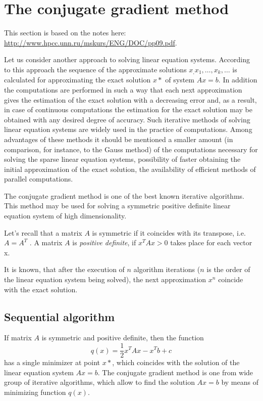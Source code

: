 
\section{The conjugate gradient method} %
\label{sec:the_conjugate_gradient_method}
This section is based on the notes here: \url{http://www.hpcc.unn.ru/mskurs/ENG/DOC/pp09.pdf}.

Let us consider another approach to solving linear equation systems. According to this approach the sequence of the approximate solutions $x_, x_1, \dots, x_k,\dots$ is calculated for approximating the exact solution $x*$ of system $Ax=b$. In addition the computations are performed in such a way that each next approximation gives the estimation of the exact solution with a decreasing error and, as a result, in case of continuous computations the estimation for the exact solution may be obtained with any desired degree of accuracy. Such iterative methods of solving linear equation systems are widely used in the practice of computations. Among advantages of these methods it should be mentioned a smaller amount (in comparison, for instance, to the Gauss method) of the computations necessary for solving the sparse linear equation systems, possibility of faster obtaining the initial approximation of the exact solution, the availability of efficient methods of parallel computations.

The conjugate gradient method is one of the best known iterative algorithms. This method may be used for solving a symmetric positive definite linear equation system of high dimensionality.

Let’s recall that a matrix $A$ is symmetric if it coincides with its transpose, i.e. $A=A^T$ . A matrix $A$ is \emph{positive definite}, if $x^T Ax > 0$ takes place for each vector x.

It is known, that after the execution of $n$ algorithm iterations ($n$ is the order of the linear equation system being solved), the next approximation $x^n$ coincide with the exact solution.

\subsection{Sequential algorithm} %
\label{sub:sequential_algorithm}

If matrix $A$ is symmetric and positive definite, then the function
\begin{equation}
  q(x) = \frac{1}{2} x^T A x - x^T b + c
\end{equation}
has a single minimizer at point $x*$, which coincides with the solution of the linear equation system $Ax=b$. The conjugate gradient method is one from wide group of iterative algorithms, which allow to find the solution $Ax=b$ by means of minimizing function $q(x)$.


